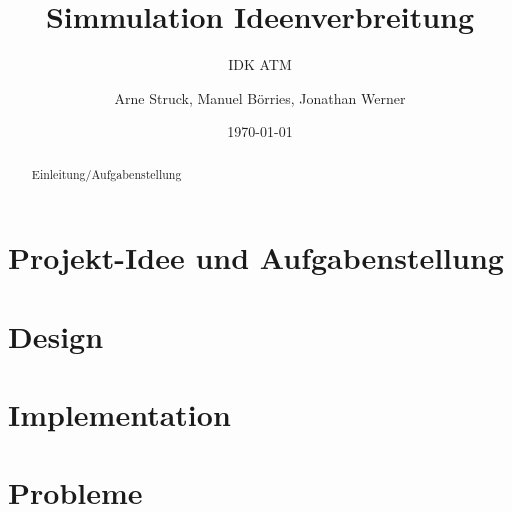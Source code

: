 \title{Simmulation Ideenverbreitung}
\subtitle{IDK ATM}

\author{Arne Struck, Manuel Börries, Jonathan Werner}

  
\date{\today}

\maketitle


\begin{abstract}
Einleitung/Aufgabenstellung
\end{abstract}

\tableofcontents
\newpage
\section{Projekt-Idee und Aufgabenstellung}
\section{Design} %
\section{Implementation}
\section{Probleme}

\pagebreak
